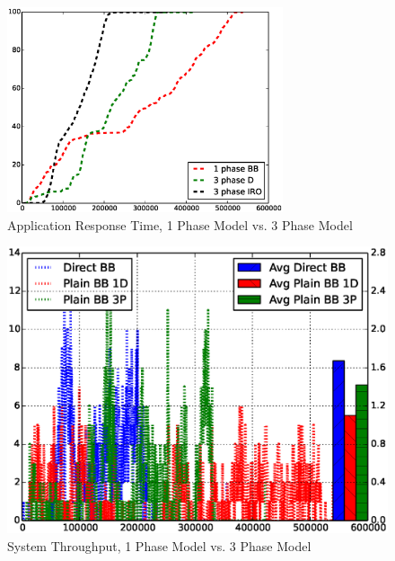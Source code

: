\begin{figure}[!t]
\centering
\includegraphics[width=3.2in]{Draw3Pvs1P/1000jobs_3p_vs_1p_response}
\caption{Application Response Time, 1 Phase Model vs. 3 Phase Model}
\label{Fig:3Pvs1PResponse}
\end{figure}

\begin{figure}[!t]
\centering
\includegraphics[width=7.0in]{Draw3Pvs1P/1000jobs_3p_vs_1p_throughput}
\caption{System Throughput, 1 Phase Model vs. 3 Phase Model}
\label{Fig:3Pvs1PThroughput}
\end{figure}


